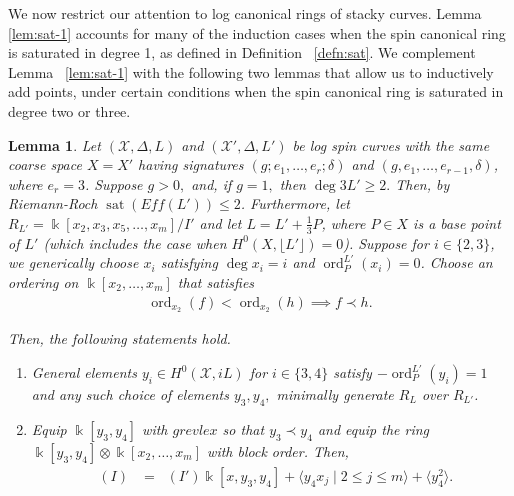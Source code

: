 \documentclass{amsart}
\theoremstyle{plain}
\newtheorem{lem}[thm]{Lemma}
\theoremstyle{definition}
\theoremstyle{remark}
\numberwithin{equation}{section}
\newcommand\Bk{{\Bbbk}}
\DeclareMathOperator{\ord}{ord}
\newcommand\sx{\mathscr X}
\newcommand{\halfcan}{L}
\DeclareMathOperator{\initial}{in_\prec}
\DeclareMathOperator{\sat}{sat}
\begin{document}
We now restrict our attention to log canonical rings of stacky curves.  Lemma \ref{lem:sat-1} accounts for many of the induction cases when the spin canonical ring is saturated in degree 1, as defined in Definition ~\ref{defn:sat}.  We complement Lemma ~\ref{lem:sat-1} with the following two lemmas that allow us to inductively add points, under certain conditions when the spin canonical ring is saturated in degree two or three.

\begin{lem}
\label{lem:sat-2}
Let $(\sx, \Delta, \halfcan)$ and $(\sx', \Delta, \halfcan')$ be log spin curves with the same coarse space $X = X'$ having signatures $(g; e_1, \ldots, e_r; \delta)$ and $(g, e_1, \ldots, e_{r- 1}, \delta)$, where $e_r=3$.  Suppose $g > 0,$ and, if $g = 1,$ then $\deg 3\halfcan' \geq 2.$ Then, by Riemann-Roch $\sat(Eff(L'))\le 2$.
Furthermore, let $R_{\halfcan'} = \Bk[x_2, x_3
, x_5, \ldots, x_m]/I'$ and let $\halfcan = \halfcan' + \frac{1}{
3}P$, where $P\in X$ is a base point of $\halfcan'$ (which includes the case when $H^0(X, \lfloor \halfcan'\rfloor) = 0$).
Suppose for $i \in \{2, 3\}$, we generically choose $x_i$ satisfying $\deg x_i = i$ and $\ord_P^{\halfcan'}(x_i)= 0$. Choose an ordering on $\Bk[x_2, \ldots, x_m]$ that satisfies
\begin{align*}
	\ord_{x_2}(f) < \ord_{x_2}(h) \implies f \prec h.
\end{align*}

\noindent
Then, the following statements hold.

\begin{enumerate}
	\item[(a)] General elements  $y_i \in H^0(\sx,iL)$ for $i \in
		\{3, 4\}$ satisfy $-\ord_P^{\halfcan'}(y_i) = 1$ and any such choice of elements
		$y_3, y_4,$ minimally generate $R_\halfcan$ over $R_{\halfcan'}$.
	\item[(b)] Equip $\Bk[y_3, y_4]$ with $grevlex$ so that $y_3 \prec 
		y_4$
		and equip the ring $\Bk[y_3, y_4] \otimes \Bk[x_2, \ldots, x_m]$ with block 
		order. Then,
		\begin{align*}
			\initial(I) &= \initial(I')\Bk[x, y_3, y_4]+\langle y_4 x_j \mid 2 \leq j \leq m \rangle +\langle y_4^2 \rangle.
		\end{align*}
\end{enumerate}
\end{lem}
\end{document}
